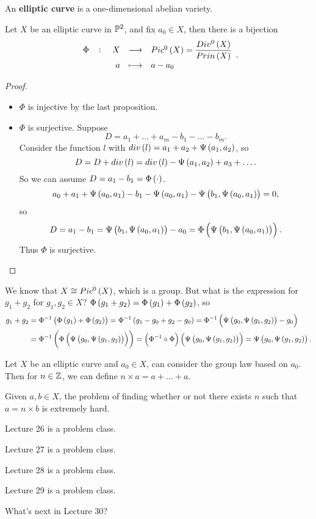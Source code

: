 \begin{definition}
An \textbf{elliptic curve} is a one-dimensional abelian variety.
\end{definition}

\begin{proposition}
Let $ X $ be an elliptic curve in $ \P^2 $, and fix $ a_0 \in X $, then there is a bijection
$$ \function[\Phi]{X}{Pic^0\br{X} = \dfrac{Div^0\br{X}}{Prin\br{X}}}{a}{a - a_0}. $$
\end{proposition}

\begin{proof}
\hfill
\begin{itemize}
\item $ \Phi $ is injective by the last proposition.
\item $ \Phi $ is surjective. Suppose
$$ D = a_1 + \dots + a_m - b_1 - \dots - b_m. $$
Consider the function $ l $ with $ div\br{l} = a_1 + a_2 + \Psi\br{a_1, a_2} $, so
$$ D = D + div\br{l} = div\br{l} - \Psi\br{a_1, a_2} + a_3 + \dots. $$
So we can assume $ D = a_1 - b_1 = \Phi\br{\cdot} $.
$$ a_0 + a_1 + \Psi\br{a_0, a_1} - b_1 - \Psi\br{a_0, a_1} - \Psi\br{b_1, \Psi\br{a_0, a_1}} = 0, $$
so
$$ D = a_1 - b_1 = \Psi\br{b_1, \Psi\br{a_0, a_1}} - a_0 = \Phi\br{\Psi\br{b_1, \Psi\br{a_0, a_1}}}. $$
Thus $ \Phi $ is surjective.
\end{itemize}
\end{proof}

We know that $ X \cong Pic^0\br{X} $, which is a group. But what is the expression for $ g_1 + g_2 $ for $ g_1, g_2 \in X $? $ \Phi\br{g_1 + g_2} = \Phi\br{g_1} + \Phi\br{g_2} $, so
\begin{align*}
g_1 + g_2
& = \Phi^{-1}\br{\Phi\br{g_1} + \Phi\br{g_2}} = \Phi^{-1}\br{g_1 - g_0 + g_2 - g_0} = \Phi^{-1}\br{\Psi\br{g_0, \Psi\br{g_1, g_2}} - g_0} \\
& = \Phi^{-1}\br{\Phi\br{\Psi\br{g_0, \Psi\br{g_1, g_2}}}} = \br{\Phi^{-1} \circ \Phi}\br{\Psi\br{g_0, \Psi\br{g_1, g_2}}} = \Psi\br{g_0, \Psi\br{g_1, g_2}}.
\end{align*}

Let $ X $ be an elliptic curve and $ a_0 \in X $, can consider the group law based on $ a_0 $. Then for $ n \in \Z $, we can define $ n \times a = a + \dots + a $.

\begin{note*}
Given $ a, b \in X $, the problem of finding whether or not there exists $ n $ such that $ a = n \times b $ is extremely hard.
\end{note*}


Lecture 26 is a problem class.


Lecture 27 is a problem class.


Lecture 28 is a problem class.


Lecture 29 is a problem class.


What's next in Lecture 30?

